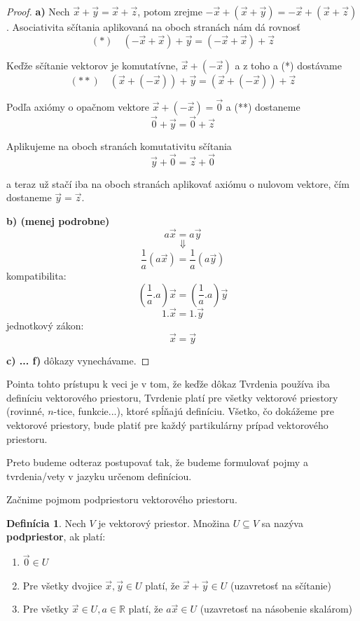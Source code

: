 \documentclass{article}
\theoremstyle{definition}
\newtheorem{definicia}{Definícia}[section]
\theoremstyle{plain}
\begin{document}
\begin{proof}
\textbf{a)}
Nech $\vec{x} + \vec{y} = \vec{x} + \vec{z}$, potom zrejme $-\vec{x} + (\vec{x} + \vec{y}) = -\vec{x} + (\vec{x} + \vec{z})$.
Asociativita sčítania aplikovaná na oboch stranách nám dá rovnosť
$$ (*) \quad (-\vec{x} + \vec{x}) + \vec{y} = (-\vec{x} + \vec{x}) + \vec{z} $$

Keďže sčítanie vektorov je komutatívne, $\vec{x} + (-\vec{x})$ a z toho a (*) dostávame
$$ (**) \quad (\vec{x} + (-\vec{x})) + \vec{y} = (\vec{x} + (-\vec{x})) + \vec{z} $$

Podľa axiómy o opačnom vektore $\vec{x} + (-\vec{x}) = \vec{0}$ a (**) dostaneme
$$ \vec{0} + \vec{y} = \vec{0} + \vec{z} $$

Aplikujeme na oboch stranách komutativitu sčítania
$$ \vec{y} + \vec{0} = \vec{z} + \vec{0} $$

a teraz už stačí iba na oboch stranách aplikovať axiómu o nulovom vektore, čím dostaneme $\vec{y} = \vec{z}$.

\textbf{b) (menej podrobne)}
$$ a\vec{x} = a\vec{y} $$
$$ \Downarrow $$
$$ \frac{1}{a}(a\vec{x}) = \frac{1}{a}(a\vec{y}) $$
kompatibilita:
$$ (\frac{1}{a} . a)\vec{x} = (\frac{1}{a} . a)\vec{y} $$
$$ 1 . \vec{x} = 1 . \vec{y} $$
jednotkový zákon:
$$ \vec{x} = \vec{y} $$

\textbf{c) ... f)} dôkazy vynechávame.
\end{proof}

Pointa tohto prístupu k veci je v tom, že keďže dôkaz Tvrdenia používa iba definíciu vektorového priestoru, Tvrdenie platí pre všetky vektorové priestory (rovinné, $n$-tice, funkcie...), ktoré spĺňajú definíciu. Všetko, čo dokážeme pre vektorové priestory, bude platiť pre každý partikulárny prípad vektorového priestoru.

Preto budeme odteraz postupovať tak, že budeme formulovať pojmy a tvrdenia/vety v jazyku určenom definíciou.

Začnime pojmom podpriestoru vektorového priestoru.

\begin{definicia}
Nech $V$ je vektorový priestor. Množina $U \subseteq V$ sa nazýva \textbf{podpriestor}, ak platí:
\begin{enumerate}
    \item $\vec{0} \in U$
    \item Pre všetky dvojice $\vec{x}, \vec{y} \in U$ platí, že $\vec{x} + \vec{y} \in U$ (uzavretosť na sčítanie)
    \item Pre všetky $\vec{x} \in U, a \in \mathbb{R}$ platí, že $a\vec{x} \in U$ (uzavretosť na násobenie skalárom)
\end{enumerate}
\end{definicia}
\end{document}
